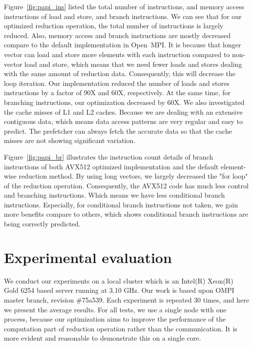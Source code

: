 \documentclass[sigconf]{acmart}
\newcommand{\ompi}[0]{Open~MPI\xspace}
\begin{document}
Figure~\ref{fig:papi_ins} listed the total number of instructions, and memory access instructions of
load and store, and branch instructions.
We can see that for our optimized reduction operation, the total number of
instructions is largely reduced. Also, memory access and branch instructions
are mostly decreased compare to the default implementation in \ompi.
It is because that longer vector can load and store more elements with each
instruction compared to non-vector load and store, which means that we need
fewer loads and stores dealing with the same amount of reduction data.
Consequently, this will decrease the loop iteration.
Our implementation reduced the number of loads and stores instructions by a factor of
90X and 60X, respectively.
At the same time, for branching instructions, our optimization decreased by 60X.
We also investigated the cache misses of L1 and L2 caches. Because we are dealing with an extensive contiguous
data, which means data access patterns are very regular and easy to predict.
The prefetcher can always fetch the accurate data so that the cache misses are not showing significant variation.

Figure~\ref{fig:papi_br} illustrates the instruction count details
of branch instructions of both AVX512 optimized implementation and the default
element-wise reduction method. By using long vectors, we largely decreased the "for loop" of the reduction
operation. Consequently, the AVX512 code has much less control and branching instructions.
Which means we have less conditional branch instructions.
Especially, for conditional branch instructions not taken, we gain
more benefits compare to others, which shows conditional branch instructions are being correctly predicted.


\section{Experimental evaluation}\label{sec:experiments}
We conduct our experiments on a local cluster which is an Intel(R) Xeon(R) Gold 6254 based server running at 3.10 GHz. Our work is based upon OMPI master branch, revision \#75a539. Each experiment is repeated 30 times, and here we present the average results. For all tests, we use a single node with one process, because our optimization aims to improve the performance of the computation part of reduction operation rather than the communication. It is more evident and reasonable to demonstrate this on a single core.
\end{document}
